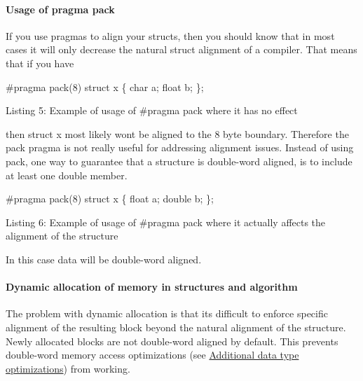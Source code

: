 \hypertarget{a00362_subsubsection__pragma_pack}{}\paragraph{Usage of pragma pack}\label{a00362_subsubsection__pragma_pack}
If you use pragmas to align your structs, then you should know that in most cases it will only decrease the natural struct alignment of a compiler. That means that if you have


\begin{DoxyCode}
\textcolor{preprocessor}{#pragma pack(8)}
\textcolor{keyword}{struct }x
\{
   \textcolor{keywordtype}{char} a;
   \textcolor{keywordtype}{float} b;
\};
\end{DoxyCode}
  Listing 5\+: Example of usage of {\ttfamily \#pragma pack} where it has no effect

then struct x most likely won\textquotesingle{}t be aligned to the 8 byte boundary. Therefore the pack pragma is not really useful for addressing alignment issues. Instead of using pack, one way to guarantee that a structure is double-\/word aligned, is to include at least one double member.


\begin{DoxyCode}
\textcolor{preprocessor}{#pragma pack(8)}
\textcolor{keyword}{struct }x
\{
   \textcolor{keywordtype}{float} a;
   \textcolor{keywordtype}{double} b;
\};
\end{DoxyCode}
  Listing 6\+: Example of usage of {\ttfamily \#pragma pack} where it actually affects the alignment of the structure

In this case data will be double-\/word aligned.

\hypertarget{a00362_subsubsection__dynamic_allocation_of_memory}{}\paragraph{Dynamic allocation of memory in structures and algorithm}\label{a00362_subsubsection__dynamic_allocation_of_memory}
The problem with dynamic allocation is that it\textquotesingle{}s difficult to enforce specific alignment of the resulting block beyond the natural alignment of the structure. Newly allocated blocks are not double-\/word aligned by default. This prevents double-\/word memory access optimizations (see \hyperlink{a00362_subsubsection__additional_data_type_optimizations_}{Additional data type optimizations}) from working.


